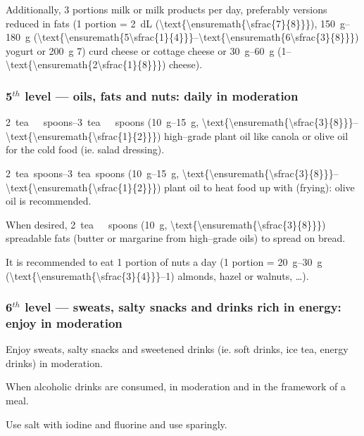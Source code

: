 \documentclass[../main.tex]{subfiles}
\begin{document}
\noindent Additionally, 3 portions milk or milk products per day, preferably versions reduced in fats
(1 portion = \SI{2}{\deci\liter} (\SI[parse-numbers=false]{\text{\ensuremath{\sfrac{7}{8}}}}{\cup}),
\SIrange{150}{180}{\gram}
(\SIrange[parse-numbers=false]{\text{\ensuremath{5\sfrac{1}{4}}}}{\text{\ensuremath{6\sfrac{3}{8}}}}{\oz}) yogurt
or \SI{200}{\gram} \SI{7}{\oz}) curd cheese or cottage cheese or \SIrange{30}{60}{\gram}
(\SIrange[parse-numbers=false]{1}{\text{\ensuremath{2\sfrac{1}{8}}}}{\oz}) cheese).

\subsubsection{5$^{th}$ level --- oils, fats and nuts: daily in moderation}

\SIrange{2}{3}{tea\ spoons} (\SIrange{10}{15}{\gram},
\SIrange[parse-numbers=false]{\text{\ensuremath{\sfrac{3}{8}}}}{\text{\ensuremath{\sfrac{1}{2}}}}{\oz})
high--grade plant oil like canola or olive oil for the cold food (ie. salad dressing).

\noindent  \SIrange{2}{3}{tea spoons}
(\SIrange{10}{15}{\gram},
\SIrange[parse-numbers=false]{\text{\ensuremath{\sfrac{3}{8}}}}{\text{\ensuremath{\sfrac{1}{2}}}}{\oz})
plant oil to heat food up with (frying): olive oil is recommended.

\noindent When desired, \SI{2}{tea\ spoons}
(\SI{10}{\gram}, \SI[parse-numbers=false]{\text{\ensuremath{\sfrac{3}{8}}}}{\oz})
spreadable fats (butter or margarine from high--grade oils) to spread on bread.

\noindent It is recommended to eat 1 portion of nuts a day (1 portion = \SIrange{20}{30}{\gram}
(\SIrange[parse-numbers=false]{\text{\ensuremath{\sfrac{3}{4}}}}{1}{\oz}) almonds, hazel or walnuts, \ldots).


\subsubsection{6$^{th}$ level --- sweats, salty snacks and drinks rich in energy: enjoy in moderation}

Enjoy sweats, salty snacks and sweetened drinks (ie. soft drinks, ice tea, energy drinks) in moderation.

\noindent When alcoholic drinks are consumed, in moderation and in the framework of a meal.

\noindent Use salt with iodine and fluorine and use sparingly.
\end{document}
